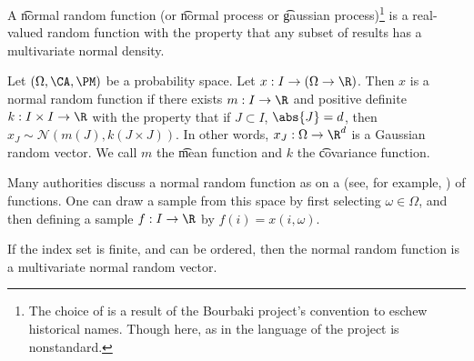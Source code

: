 

A \t{normal random function} (or \t{normal process} or \t{gaussian process})\footnote{The choice of  is a result of the Bourbaki project's convention to eschew historical names. Though here, as in  the language of the project is nonstandard.} is a real-valued random function with the property that any subset of results has a multivariate normal density.

Let $(\Omega, \CA, \PM)$ be a probability space.
Let $x: I \to (\Omega \to \R)$.
Then $x$ is a normal random function if there exists $m: I \to \R$ and positive definite $k: I \times I \to \R$ with the property that if $J \subset I$, $\abs{J} = d$, then $x_J \sim \mathcal{N}(m(J), k(J \times J))$.
In other words, $x_J: \Omega \to \R^d$ is a Gaussian random vector.
We call $m$ the \t{mean function} and $k$ the \t{covariance function}.


Many authorities discuss a normal random function as  on a  (see, for example, ) of functions.
One can draw a sample from this space by first selecting $\omega \in \Omega$, and then defining a sample $f: I \to \R$ by $f(i) = x(i, \omega)$.


If the index set is finite, and can be ordered, then the normal random function is a multivariate normal random vector.

\blankpage
